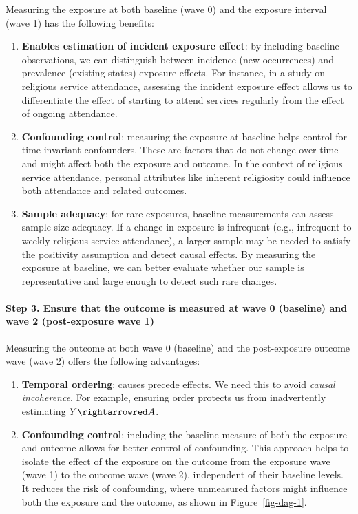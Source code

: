 \documentclass[
  singlecolumn]{article}
\let\oldparagraph\paragraph
\renewcommand{\paragraph}[1]{\oldparagraph{#1}\mbox{}}
\begin{document}
Measuring the exposure at both baseline (wave 0) and the exposure
interval (wave 1) has the following benefits:

\begin{enumerate}
\def\labelenumi{\arabic{enumi}.}
\item
  \textbf{Enables estimation of incident exposure effect}: by including
  baseline observations, we can distinguish between incidence (new
  occurrences) and prevalence (existing states) exposure effects. For
  instance, in a study on religious service attendance, assessing the
  incident exposure effect allows us to differentiate the effect of
  starting to attend services regularly from the effect of ongoing
  attendance.
\item
  \textbf{Confounding control}: measuring the exposure at baseline helps
  control for time-invariant confounders. These are factors that do not
  change over time and might affect both the exposure and outcome. In
  the context of religious service attendance, personal attributes like
  inherent religiosity could influence both attendance and related
  outcomes.
\item
  \textbf{Sample adequacy}: for rare exposures, baseline measurements
  can assess sample size adequacy. If a change in exposure is infrequent
  (e.g., infrequent to weekly religious service attendance), a larger
  sample may be needed to satisfy the positivity assumption and detect
  causal effects. By measuring the exposure at baseline, we can better
  evaluate whether our sample is representative and large enough to
  detect such rare changes.
\end{enumerate}

\paragraph{Step 3. Ensure that the outcome is measured at wave 0
(baseline) and wave 2 (post-exposure wave
1)}\label{step-3.-ensure-that-the-outcome-is-measured-at-wave-0-baseline-and-wave-2-post-exposure-wave-1}

Measuring the outcome at both wave 0 (baseline) and the post-exposure
outcome wave (wave 2) offers the following advantages:

\begin{enumerate}
\def\labelenumi{\arabic{enumi}.}
\item
  \textbf{Temporal ordering}: causes precede effects. We need this to
  avoid \emph{causal incoherence}. For example, ensuring order protects
  us from inadvertently estimating \(Y\rightarrowred A\).
\item
  \textbf{Confounding control}: including the baseline measure of both
  the exposure and outcome allows for better control of confounding.
  This approach helps to isolate the effect of the exposure on the
  outcome from the exposure wave (wave 1) to the outcome wave (wave 2),
  independent of their baseline levels. It reduces the risk of
  confounding, where unmeasured factors might influence both the
  exposure and the outcome, as shown in Figure~\ref{fig-dag-1}.
\end{enumerate}
\end{document}

